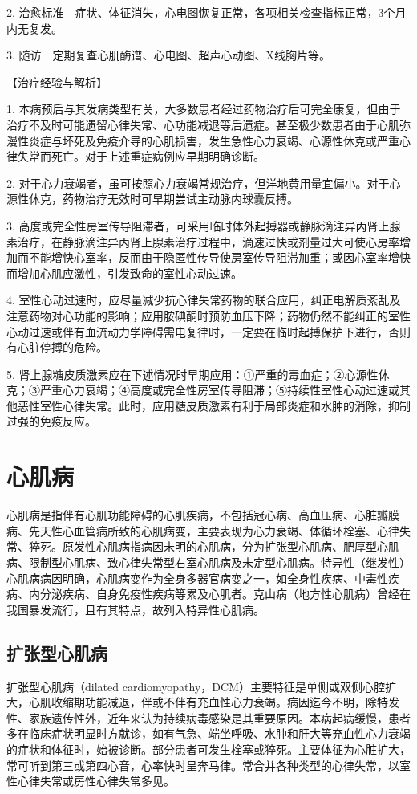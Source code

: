 2.
治愈标准　症状、体征消失，心电图恢复正常，各项相关检查指标正常，3个月内无复发。

3. 随访　定期复查心肌酶谱、心电图、超声心动图、X线胸片等。

【治疗经验与解析】

1.
本病预后与其发病类型有关，大多数患者经过药物治疗后可完全康复，但由于治疗不及时可能遗留心律失常、心功能减退等后遗症。甚至极少数患者由于心肌弥漫性炎症与坏死及免疫介导的心肌损害，发生急性心力衰竭、心源性休克或严重心律失常而死亡。对于上述重症病例应早期明确诊断。

2.
对于心力衰竭者，虽可按照心力衰竭常规治疗，但洋地黄用量宜偏小。对于心源性休克，药物治疗无效时可早期尝试主动脉内球囊反搏。

3.
高度或完全性房室传导阻滞者，可采用临时体外起搏器或静脉滴注异丙肾上腺素治疗，在静脉滴注异丙肾上腺素治疗过程中，滴速过快或剂量过大可使心房率增加而不能增快心室率，反而由于隐匿性传导使房室传导阻滞加重；或因心室率增快而增加心肌应激性，引发致命的室性心动过速。

4.
室性心动过速时，应尽量减少抗心律失常药物的联合应用，纠正电解质紊乱及注意药物对心功能的影响；应用胺碘酮时预防血压下降；药物仍然不能纠正的室性心动过速或伴有血流动力学障碍需电复律时，一定要在临时起搏保护下进行，否则有心脏停搏的危险。

5.
肾上腺糖皮质激素应在下述情况时早期应用：①严重的毒血症；②心源性休克；③严重心力衰竭；④高度或完全性房室传导阻滞；⑤持续性室性心动过速或其他恶性室性心律失常。此时，应用糖皮质激素有利于局部炎症和水肿的消除，抑制过强的免疫反应。


\section{心肌病}

心肌病是指伴有心肌功能障碍的心肌疾病，不包括冠心病、高血压病、心脏瓣膜病、先天性心血管病所致的心肌病变，主要表现为心力衰竭、体循环栓塞、心律失常、猝死。原发性心肌病指病因未明的心肌病，分为扩张型心肌病、肥厚型心肌病、限制型心肌病、致心律失常型右室心肌病及未定型心肌病。特异性（继发性）心肌病病因明确，心肌病变作为全身多器官病变之一，如全身性疾病、中毒性疾病、内分泌疾病、自身免疫性疾病等累及心肌者。克山病（地方性心肌病）曾经在我国暴发流行，且有其特点，故列入特异性心肌病。

\subsection{扩张型心肌病}

扩张型心肌病（dilated
cardiomyopathy，DCM）主要特征是单侧或双侧心腔扩大，心肌收缩期功能减退，伴或不伴有充血性心力衰竭。病因迄今不明，除特发性、家族遗传性外，近年来认为持续病毒感染是其重要原因。本病起病缓慢，患者多在临床症状明显时方就诊，如有气急、端坐呼吸、水肿和肝大等充血性心力衰竭的症状和体征时，始被诊断。部分患者可发生栓塞或猝死。主要体征为心脏扩大，常可听到第三或第四心音，心率快时呈奔马律。常合并各种类型的心律失常，以室性心律失常或房性心律失常多见。

